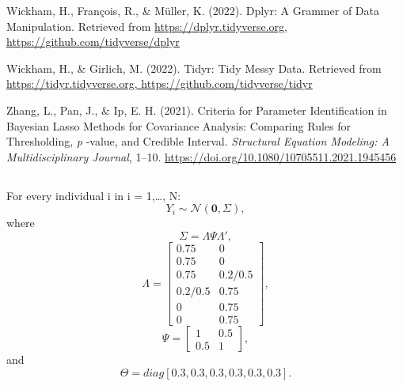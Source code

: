 \documentclass[
  man, donotrepeattitle,floatsintext]{apa6}
\newlength{\cslhangindent}
\newlength{\cslentryspacingunit} %
\newenvironment{CSLReferences}[2] %
 {%
  \setlength{\parindent}{0pt}
  \ifodd #1
  \let\oldpar\par
  \def\par{\hangindent=\cslhangindent\oldpar}
  \fi
  \setlength{\parskip}{#2\cslentryspacingunit}
 }%
 {}
\begin{document}
\begin{CSLReferences}{1}{0}
\leavevmode{}%
Wickham, H., François, R., \& Müller, K. (2022). Dplyr: {A} {Grammer} of {Data} {Manipulation}. Retrieved from \href{https://dplyr.tidyverse.org,\%20https://github.com/tidyverse/dplyr}{https://dplyr.tidyverse.org, https://github.com/tidyverse/dplyr}

\leavevmode{}%
Wickham, H., \& Girlich, M. (2022). Tidyr: {Tidy} {Messy} {Data}. Retrieved from \href{https://tidyr.tidyverse.org,\%20https://github.com/tidyverse/tidyr}{https://tidyr.tidyverse.org, https://github.com/tidyverse/tidyr}

\leavevmode{}%
Zhang, L., Pan, J., \& Ip, E. H. (2021). Criteria for {Parameter} {Identification} in {Bayesian} {Lasso} {Methods} for {Covariance} {Analysis}: {Comparing} {Rules} for {Thresholding}, \emph{p} -value, and {Credible} {Interval}. \emph{Structural Equation Modeling: A Multidisciplinary Journal}, 1--10. \url{https://doi.org/10.1080/10705511.2021.1945456}

\end{CSLReferences}

\endgroup


\clearpage
\makeatletter
\efloat@restorefloats
\makeatother


\begin{appendix}
\section{}
For every individual i in i = 1,\ldots, N:
\[Y_i \sim \mathcal{N}(\mathbf{0}, \Sigma),\] where
\[\Sigma = \Lambda\Psi\Lambda',\] \[\Lambda = 
\begin{bmatrix}
0.75 & 0 \\
0.75 & 0 \\
0.75 & 0.2/0.5 \\
0.2/0.5 & 0.75 \\
0 & 0.75 \\
0 & 0.75
\end{bmatrix},\] \[\Psi =
\begin{bmatrix}
1 & 0.5 \\
0.5 & 1
\end{bmatrix}
,\] and \[\Theta = diag[0.3, 0.3, 0.3, 0.3, 0.3, 0.3].\]
\end{appendix}
\end{document}
